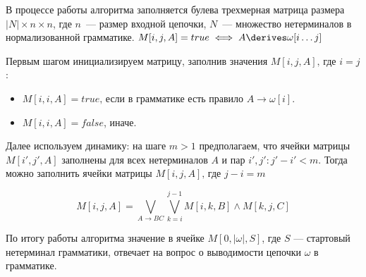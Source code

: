 В процессе работы алгоритма заполняется булева трехмерная матрица размера $|N| \times n \times n$, где $n$~---  размер входной цепочки, $N$~--- множество нетерминалов в нормализованной грамматике. 
$M[i, j, A] = true \iff A \derives \omega[i \dots j]$

Первым шагом инициализируем матрицу, заполнив значения $M[i, j, A] \text{, где }i = j$: 

\begin{itemize}
  \item $M[i, i, A] = true \text{, если в грамматике есть правило } A \to \omega[i]$.
  \item $M[i, i, A] = false$, иначе.
\end{itemize}

Далее используем динамику: на шаге $m > 1$ предполагаем, что ячейки матрицы $M[i', j', A]$ заполнены для всех нетерминалов $A$ и пар $i', j': j' - i' < m$.
Тогда можно заполнить ячейки матрицы $M[i, j, A] \text{, где } j - i = m$

\[ M[i, j, A] = \bigvee_{A \to B C}^{}{\bigvee_{k=i}^{j-1}{M[i, k, B] \wedge M[k, j, C]}} \]

По итогу работы алгоритма значение в ячейке $M[0, |\omega|, S]$, где $S$ --- стартовый нетерминал грамматики, отвечает на вопрос о выводимости цепочки $\omega$ в грамматике. 

